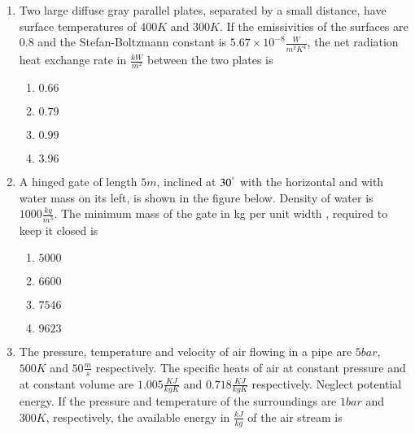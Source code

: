 \documentclass[journal]{IEEEtran}
\numberwithin{equation}{enumi}
\numberwithin{figure}{enumi}
\begin{document}
\begin{enumerate}
    \item 
    Two large diffuse gray parallel plates, separated by a small distance, have surface temperatures of $400 K$ and $300 K$. If the emissivities of the surfaces are $0.8$ and the Stefan-Boltzmann constant is $5.67 \times 10^{-8}\frac{W}{m^2K^4}$, the net radiation heat exchange rate in $\frac{kW}{m^2}$ between the two plates is

    \begin{multicols}{4}
        \begin{enumerate}
            \item $0.66$
            \item $0.79$
            \item $0.99$
            \item $3.96$
        \end{enumerate}
    \end{multicols}

    \item 
    A hinged gate of length $5 m$, inclined at $30^\degree$ with the horizontal and with water mass on its left, is shown in the figure below. Density of water is $1000 \frac{kg}{m^3}$. The minimum mass of the gate in kg per unit width , required to keep it closed is

    \begin{figure}[H]
    \centering
    \resizebox{0.7\textwidth}{!}{}

\label{fig:my_label}
\end{figure}

    \begin{multicols}{4}
        \begin{enumerate}
            \item $5000$
            \item $6600$
            \item $7546$
            \item $9623$
        \end{enumerate}
    \end{multicols}

    \item 
    The pressure, temperature and velocity of air flowing in a pipe are $5 bar$, $500 K$ and $50 \frac{m}{s}$ respectively. The specific heats of air at constant pressure and at constant volume are $1.005 \frac{KJ}{kgK}$ and $0.718 \frac{KJ}{kgK}$ respectively. Neglect potential energy. If the pressure and temperature of the surroundings are $1 bar$ and $300 K$, respectively, the available energy in $\frac{kJ}{kg}$ of the air stream is


\end{enumerate}
\end{document}
